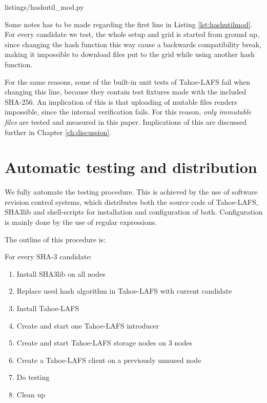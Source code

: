 \documentclass[english,12pt,a4paper]{book}
\begin{document}

{listings/hashutil_mod.py}

Some notes has to be made regarding the first line in Listing
\ref{lst:hashutilmod}. For every candidate we test, the whole setup and grid is
started from ground up, since changing the hash function this way cause a
backwards compatibility break, making it impossible to download files put to the
grid while using another hash function.

For the same reasons, some of the built-in unit tests of Tahoe-LAFS fail when
changing this line, because they contain test fixtures made with the included
SHA-256.  An implication of this is that uploading of mutable files renders
impossible, since the internal verification fails. For this reason, \emph{only
immutable files} are tested and measured in this paper. Implications of this are
discussed further in Chapter \ref{ch:discussion}.

\section{Automatic testing and distribution}
We fully automate the testing procedure. This is achieved by the use of
software revision control systems, which distributes both the source code of
Tahoe-LAFS, SHA3lib and shell-scripts for installation and configuration of
both. Configuration is mainly done by the use of regular expressions.

The outline of this procedure is:

\vspace{12pt}
\noindent For every \ac{SHA}-3 candidate:
        \begin{enumerate}
            \item Install SHA3lib on all nodes
            \item Replace used hash algorithm in Tahoe-LAFS with current
            candidate
            \item Install Tahoe-LAFS
            \item Create and start one Tahoe-LAFS introducer
            \item Create and start Tahoe-LAFS storage nodes on 3 nodes
            \item Create a Tahoe-LAFS client on a previously unnused node
            \item Do testing
            \item Clean up
        \end{enumerate}
\end{document}
